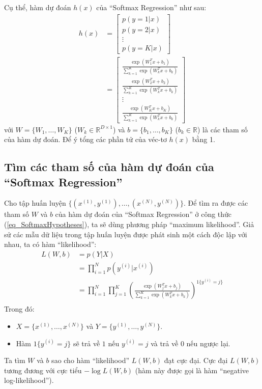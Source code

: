 Cụ thể, hàm dự đoán $h(x)$ của ``Softmax Regression'' như sau:
\begin{equation}
\begin{split}
	h(x) &= \left[\begin{array}{c}
			p(y=1|x)\\
			p(y=2|x)\\
			\vdots\\
			p(y=K|x)
			\end{array}\right]\\
		 &= \left[\begin{array}{c}
		 	\frac{\exp(W_1^Tx + b_1)}{\sum_{k=1}^{K}\exp(W_k^Tx + b_k)}\\
		 	\frac{\exp(W_2^Tx + b_2)}{\sum_{k=1}^{K}\exp(W_k^Tx + b_k)}\\
		 	\vdots\\
		 	\frac{\exp(W_K^Tx + b_K)}{\sum_{k=1}^{K}\exp(W_k^Tx + b_k)}
		 	\end{array}\right]
\end{split}
\label{eq_SoftmaxHypotheses}
\end{equation}
với $W=\{W_1, \ldots, W_K\}$ ($W_k \in \mathbb{R}^{D\times 1}$) và $b = \{b_1, \ldots, b_K\}$ ($b_k \in \mathbb{R}$) là các tham số của hàm dự đoán. Để ý tổng các phần tử của véc-tơ $h(x)$ bằng 1.
\subsection{Tìm các tham số của hàm dự đoán của ``Softmax Regression''}
Cho tập huấn luyện $\{(x^{(1)}, y^{(1)}), \ldots, (x^{(N)}, y^{(N)})\}$. Để tìm ra được các tham số $W$ và $b$ của hàm dự đoán của ``Softmax Regression'' ở công thức (\ref{eq_SoftmaxHypotheses}), ta sẽ dùng phương pháp ``maximum likelihood''. Giả sử các mẫu dữ liệu trong tập huấn luyện được phát sinh một cách độc lập với nhau, ta có hàm ``likelihood'':
\begin{equation}
\begin{split}
	L(W, b) &= p(Y|X)\\
			&= \prod_{i=1}^{N} p(y^{(i)}|x^{(i)})\\
			&= \prod_{i=1}^{N} \prod_{j=1}^K \left(\frac{\exp(W_j^Tx + b_j)}{\sum_{k=1}^{K}\exp(W_k^Tx + b_k)}\right)^{1\{y^{(i)}=j\}}\\
\end{split}
\end{equation}
Trong đó:
\begin{itemize}
	\item $X = \{x^{(1)}, \ldots, x^{(N)}\}$ và $Y = \{y^{(1)}, \ldots, y^{(N)}\}$.
	\item Hàm ${1\{y^{(i)}=j\}}$ sẽ trả về $1$ nếu $y^{(i)}=j$ và trả về $0$ nếu ngược lại.
\end{itemize}
Ta tìm $W$ và $b$ sao cho hàm ``likelihood'' $L(W, b)$ đạt cực đại. Cực đại $L(W, b)$ tương đương với cực tiểu $-\log L(W, b)$ (hàm này được gọi là hàm ``negative log-likelihood'').

